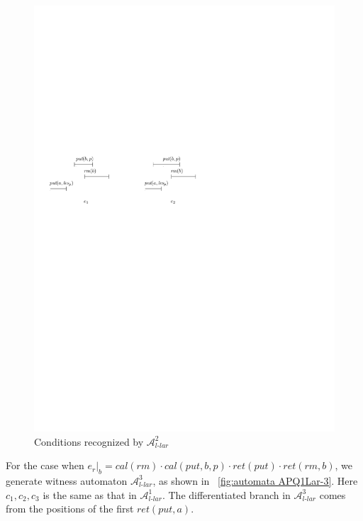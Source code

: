 \begin{figure}[htbp]
  \centering
  \includegraphics[width=0.7 \textwidth]{figures/PIC_HIS_PQ1Lar-prpr.pdf}
  \caption{Conditions recognized by $\mathcal{A}_{\textit{l-lar}}^2$}
  \label{fig:his for APQ1Lar-2}
\end{figure}

For the case when $e_r \vert_{b} = \textit{cal}(\textit{rm}) \cdot \textit{cal}(\textit{put},b,p) \cdot \textit{ret}(\textit{put}) \cdot \textit{ret}(\textit{rm},b)$, we generate witness automaton $\mathcal{A}_{\textit{l-lar}}^3$, as shown in \figurename~\ref{fig:automata APQ1Lar-3}. Here $c_1,c_2,c_3$ is the same as that in $\mathcal{A}_{\textit{l-lar}}^1$. The differentiated branch in $\mathcal{A}_{\textit{l-lar}}^3$ comes from the positions of the first $\textit{ret}(\textit{put},a)$.


